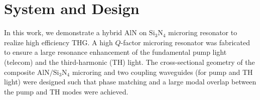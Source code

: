 \documentclass[9pt,twocolumn,twoside]{optica}
\begin{document}
\section{System and Design}
\label{sec:system}

In this work, we demonstrate a hybrid $\mathrm{AlN}$ on $\mathrm{Si_{3}N_{4}}$ microring resonator to realize high efficiency THG. A high $Q$-factor microring resonator was fabricated to ensure a large resonance enhancement of the fundamental pump light (telecom) and the third-harmonic (TH) light. The cross-sectional geometry of the composite $\mathrm{AlN/Si_3N_4}$ microring and two coupling waveguides (for pump and TH light) were designed such that phase matching and a large modal overlap between the pump and TH modes were achieved. 
\end{document}
